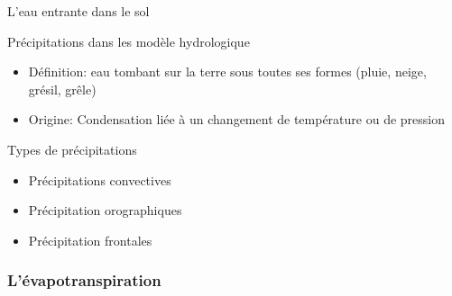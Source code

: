 \documentclass{beamer}
\numberwithin{equation}{section}
\begin{document}
	\begin{frame}{L'eau entrante dans le sol}
		\begin{block}{Précipitations dans les modèle hydrologique}
			\begin{itemize}
				\item Définition: eau tombant sur la terre sous toutes ses formes (pluie, neige, grésil, grêle)
				\item Origine: Condensation liée à un changement de température ou de pression 
			\end{itemize}
		\end{block}
		\begin{block}{Types de précipitations}
			\begin{itemize}
				\item Précipitations convectives
				\item Précipitation orographiques
				\item Précipitation frontales 
			\end{itemize}
		\end{block}
	\end{frame}

	\subsubsection{L'évapotranspiration}
	
\end{document}
